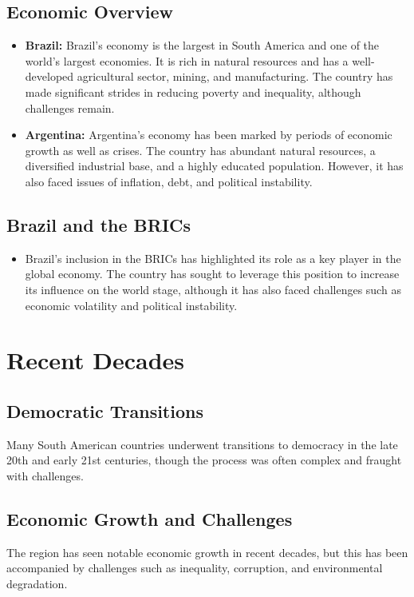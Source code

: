 \documentclass[a4paper,12pt]{book}
\begin{document}
\subsection{Economic Overview}
\label{subsec:economic-overview}
\begin{itemize}
    \item \textbf{Brazil:} Brazil's economy is the largest in South America and one of the world's largest economies. It is rich in natural resources and has a well-developed agricultural sector, mining, and manufacturing. The country has made significant strides in reducing poverty and inequality, although challenges remain.
    \item \textbf{Argentina:} Argentina's economy has been marked by periods of economic growth as well as crises. The country has abundant natural resources, a diversified industrial base, and a highly educated population. However, it has also faced issues of inflation, debt, and political instability.
\end{itemize}

\subsection{Brazil and the BRICs}
\label{subsec:brazil-brics}
\begin{itemize}
    \item Brazil's inclusion in the BRICs has highlighted its role as a key player in the global economy. The country has sought to leverage this position to increase its influence on the world stage, although it has also faced challenges such as economic volatility and political instability.
\end{itemize}

\section{Recent Decades}
\label{sec:recent-decades}

\subsection{Democratic Transitions}
\label{subsec:democratic-transitions}
Many South American countries underwent transitions to democracy in the late 20th and early 21st centuries, though the process was often complex and fraught with challenges.

\subsection{Economic Growth and Challenges}
\label{subsec:economic-growth-challenges}
The region has seen notable economic growth in recent decades, but this has been accompanied by challenges such as inequality, corruption, and environmental degradation.
\end{document}
